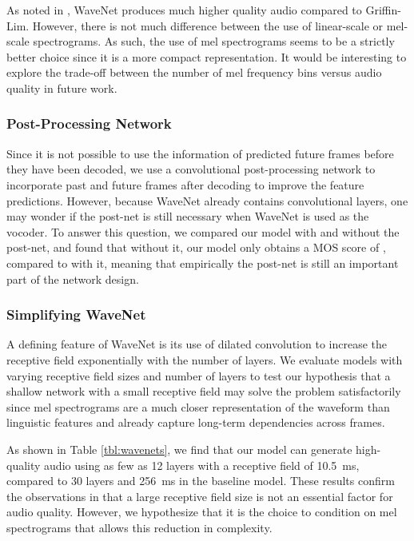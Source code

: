 As noted in \cite{DBLP:journals/corr/ArikDGMPPRZ17}, WaveNet produces much
higher quality audio compared to Griffin-Lim. However, there is not much
difference between the use of linear-scale or mel-scale spectrograms. As such,
the use of mel spectrograms seems to be a strictly better choice since it is a
more compact representation. It would be interesting to explore the
trade-off between the number of mel frequency bins versus audio quality
in future work.


\subsubsection{Post-Processing Network}
\label{ssec:postedit}

Since it is not possible to use the information of predicted future frames
before they have been decoded, we use a convolutional post-processing network
to incorporate past and future frames after decoding to improve the feature
predictions. However, because WaveNet already contains convolutional layers,
one may wonder if the post-net is still necessary when WaveNet is used as the
vocoder. To answer this
question, we compared our model with and without the post-net, and found that
without it, our model only obtains a MOS score of , compared to
 with it, meaning that empirically the post-net is still an
important part of the network design.


\subsubsection{Simplifying WaveNet}
\label{ssec:simplifywavenet}

A defining feature of WaveNet is its use of dilated convolution to increase
the receptive field exponentially with the number of layers.
We evaluate models with varying receptive field sizes and number of
layers to test our hypothesis that a shallow network with a small receptive
field may solve the problem satisfactorily since mel spectrograms are a much
closer representation of the waveform than linguistic features and already
capture long-term dependencies across frames.

As shown in Table \ref{tbl:wavenets}, we find that our model can generate
high-quality audio using as few as 12 layers with a receptive field of
10.5~ms, compared to 30 layers and 256~ms in the baseline model. These
results confirm the observations in \cite{DBLP:journals/corr/ArikCCDGKLMRSS17}
that a large receptive field size is not an essential factor for audio
quality. However, we hypothesize that it is the choice to condition on mel
spectrograms that allows this reduction in complexity.

